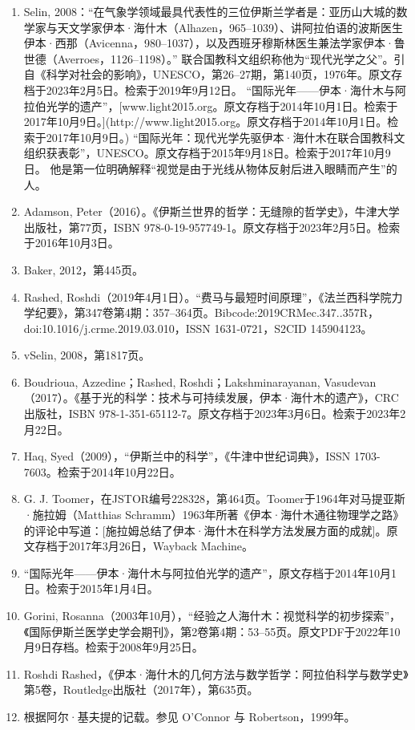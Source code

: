 \begin{enumerate}
\item Selin, 2008：“在气象学领域最具代表性的三位伊斯兰学者是：亚历山大城的数学家与天文学家伊本·海什木（Alhazen，965–1039）、讲阿拉伯语的波斯医生伊本·西那（Avicenna，980–1037），以及西班牙穆斯林医生兼法学家伊本·鲁世德（Averroes，1126–1198）。”
联合国教科文组织称他为“现代光学之父”。引自《科学对社会的影响》，UNESCO，第26–27期，第140页，1976年。原文存档于2023年2月5日。检索于2019年9月12日。
“国际光年——伊本·海什木与阿拉伯光学的遗产”，[www.light2015.org。原文存档于2014年10月1日。检索于2017年10月9日。](http://www.light2015.org。原文存档于2014年10月1日。检索于2017年10月9日。)
“国际光年：现代光学先驱伊本·海什木在联合国教科文组织获表彰”，UNESCO。原文存档于2015年9月18日。检索于2017年10月9日。
他是第一位明确解释“视觉是由于光线从物体反射后进入眼睛而产生”的人。
\item Adamson, Peter（2016）。《伊斯兰世界的哲学：无缝隙的哲学史》，牛津大学出版社，第77页，ISBN 978-0-19-957749-1。原文存档于2023年2月5日。检索于2016年10月3日。
\item Baker, 2012，第445页。
\item Rashed, Roshdi（2019年4月1日）。“费马与最短时间原理”，《法兰西科学院力学纪要》，第347卷第4期：357–364页。Bibcode:2019CRMec.347..357R，doi:10.1016/j.crme.2019.03.010，ISSN 1631-0721，S2CID 145904123。
\item vSelin, 2008，第1817页。
\item Boudrioua, Azzedine；Rashed, Roshdi；Lakshminarayanan, Vasudevan（2017）。《基于光的科学：技术与可持续发展，伊本·海什木的遗产》，CRC出版社，ISBN 978-1-351-65112-7。原文存档于2023年3月6日。检索于2023年2月22日。
\item Haq, Syed（2009），“伊斯兰中的科学”，《牛津中世纪词典》，ISSN 1703-7603。检索于2014年10月22日。
\item G. J. Toomer，在JSTOR编号228328，第464页。Toomer于1964年对马提亚斯·施拉姆（Matthias Schramm）1963年所著《伊本·海什木通往物理学之路》的评论中写道：[施拉姆总结了伊本·海什木在科学方法发展方面的成就]。原文存档于2017年3月26日，Wayback Machine。
\item “国际光年——伊本·海什木与阿拉伯光学的遗产”，原文存档于2014年10月1日。检索于2015年1月4日。
\item Gorini, Rosanna（2003年10月），“经验之人海什木：视觉科学的初步探索”，《国际伊斯兰医学史学会期刊》，第2卷第4期：53–55页。原文PDF于2022年10月9日存档。检索于2008年9月25日。
\item Roshdi Rashed，《伊本·海什木的几何方法与数学哲学：阿拉伯科学与数学史》第5卷，Routledge出版社（2017年），第635页。
\item 根据阿尔·基夫提的记载。参见 O'Connor 与 Robertson，1999年。

\end{enumerate}

